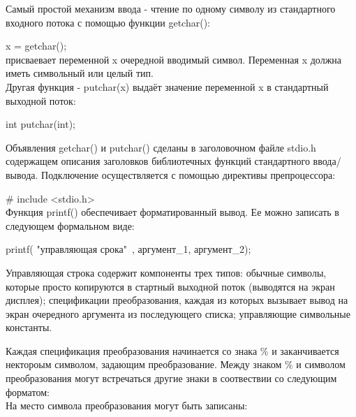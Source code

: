 \documentclass[a4paper, fontsize=10bp]{article} %
\begin{document}
\noindent Самый простой механизм ввода - чтение по одному символу из стандартного входного потока с помощью 
функции getchar():

x = getchar(); \\
присваевает переменной x очередной вводимый символ. Переменная x должна иметь символьный или целый тип. \\
Другая функция - putchar(x) выдаёт значение переменной x в стандартный выходной поток:

int putchar(int);

Объявления getchar() и putchar() сделаны в заголовочном файле stdio.h содержащем описания заголовков библиотечных
функций стандартного ввода/вывода. Подключение осуществляется с помощью директивы препроцессора:

\# include <stdio.h>\\
Функция printf() обеспечивает форматированный вывод. Ее можно записать в следующем формальном виде:

printf( "управляющая срока"\ , аргумент\_1, аргумент\_2);

\noindent Управляющая строка содержит компоненты трех типов: обычные символы, которые просто копируются в
стартный выходной поток (выводятся на экран дисплея); спецификации преобразования, каждая из
которых вызывает вывод на экран очередного аргумента из последующего списка; управляющие 
символьные константы.

\noindent Каждая спецификация преобразования начинается со знака \% и заканчивается нектороым символом,
задающим преобразование. Между знаком \% и символом преобразования могут встречаться другие знаки в
соотвествии со следующим форматом:\\
На место символа преобразования могут быть записаны:
\end{document}

